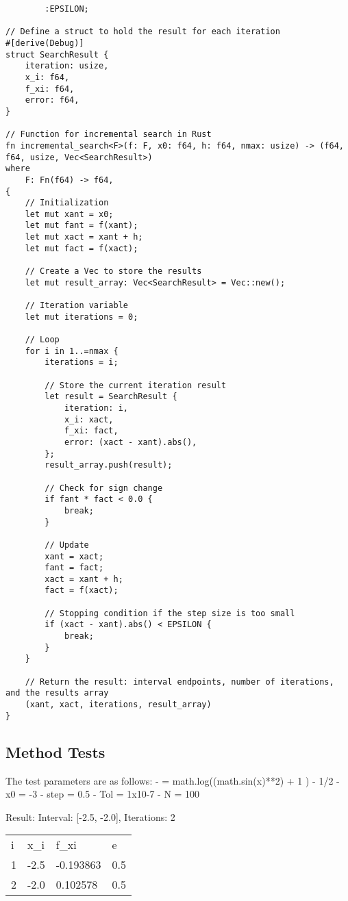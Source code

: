 \documentclass{article}
\begin{document}
\begin{verbatim}
        :EPSILON;

// Define a struct to hold the result for each iteration
#[derive(Debug)]
struct SearchResult {
    iteration: usize,
    x_i: f64,
    f_xi: f64,
    error: f64,
}

// Function for incremental search in Rust
fn incremental_search<F>(f: F, x0: f64, h: f64, nmax: usize) -> (f64, f64, usize, Vec<SearchResult>)
where
    F: Fn(f64) -> f64,
{
    // Initialization
    let mut xant = x0;
    let mut fant = f(xant);
    let mut xact = xant + h;
    let mut fact = f(xact);

    // Create a Vec to store the results
    let mut result_array: Vec<SearchResult> = Vec::new();

    // Iteration variable
    let mut iterations = 0;

    // Loop
    for i in 1..=nmax {
        iterations = i;

        // Store the current iteration result
        let result = SearchResult {
            iteration: i,
            x_i: xact,
            f_xi: fact,
            error: (xact - xant).abs(),
        };
        result_array.push(result);

        // Check for sign change
        if fant * fact < 0.0 {
            break;
        }

        // Update
        xant = xact;
        fant = fact;
        xact = xant + h;
        fact = f(xact);

        // Stopping condition if the step size is too small
        if (xact - xant).abs() < EPSILON {
            break;
        }
    }

    // Return the result: interval endpoints, number of iterations, and the results array
    (xant, xact, iterations, result_array)
}
        \end{verbatim}

    \subsection{Method Tests}\label{subsec:method-tests}

The test parameters are as follows:
        - \textflorin = math.log((math.sin(x)**2) + 1 ) - 1/2
        - x0 = -3
        - step = 0.5
        - Tol = 1x10-7
        - N = 100

    Result:
        Interval: [-2.5, -2.0], Iterations: 2

        \begin{table}[Execution Resuts]
        \begin{tabular}{llll}
        i & x\_i & f\_xi     & e   \\
        1 & -2.5 & -0.193863 & 0.5 \\
        2 & -2.0 & 0.102578  & 0.5
        \end{tabular}\label{tab:table}
        \end{table}
\end{document}
